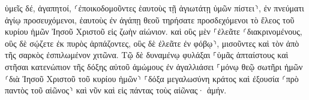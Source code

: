 \documentclass{openreader}
\begin{document}
ὑμεῖς δέ, ἀγαπητοί, ⸂ἐποικοδομοῦντες ἑαυτοὺς τῇ ἁγιωτάτῃ ὑμῶν πίστει⸃, ἐν πνεύματι ἁγίῳ προσευχόμενοι, 
ἑαυτοὺς ἐν ἀγάπῃ θεοῦ τηρήσατε προσδεχόμενοι τὸ ἔλεος τοῦ κυρίου ἡμῶν Ἰησοῦ Χριστοῦ εἰς ζωὴν αἰώνιον. 
καὶ οὓς μὲν ⸀ἐλεᾶτε ⸂διακρινομένους, 
οὓς δὲ σῴζετε ἐκ πυρὸς ἁρπάζοντες, οὓς δὲ ἐλεᾶτε ἐν φόβῳ⸃, μισοῦντες καὶ τὸν ἀπὸ τῆς σαρκὸς ἐσπιλωμένον χιτῶνα. 
Τῷ δὲ δυναμένῳ φυλάξαι ⸀ὑμᾶς ἀπταίστους καὶ στῆσαι κατενώπιον τῆς δόξης αὐτοῦ ἀμώμους ἐν ἀγαλλιάσει 
⸀μόνῳ θεῷ σωτῆρι ἡμῶν ⸂διὰ Ἰησοῦ Χριστοῦ τοῦ κυρίου ἡμῶν⸃ ⸀δόξα μεγαλωσύνη κράτος καὶ ἐξουσία ⸂πρὸ παντὸς τοῦ αἰῶνος⸃ καὶ νῦν καὶ εἰς πάντας τοὺς αἰῶνας· ἀμήν. 
\end{document}
